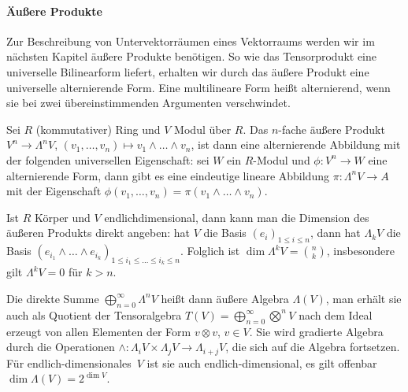 \paragraph{Äußere Produkte} Zur Beschreibung von Untervektorräumen eines Vektorraums werden wir im nächsten Kapitel äußere Produkte benötigen. So wie das Tensorprodukt eine universelle Bilinearform liefert, erhalten wir durch das äußere Produkt eine universelle alternierende Form. Eine multilineare Form heißt alternierend, wenn sie bei zwei übereinstimmenden Argumenten verschwindet.

\begin{defin}
Sei $R$ (kommutativer) Ring und $V$ Modul über $R$. Das $n$-fache äußere Produkt $V^n \to \Lambda^n V$, $(v_1, \dots, v_n) \mapsto v_1 \wedge \dots \wedge v_n$, ist dann eine alternierende Abbildung mit der folgenden universellen Eigenschaft: sei $W$ ein $R$-Modul und $\phi: V^n \to W$ eine alternierende Form, dann gibt es eine eindeutige lineare Abbildung $\pi: \Lambda^n V \to A$ mit der Eigenschaft $\phi(v_1, \dots, v_n) = \pi(v_1 \wedge \dots \wedge v_n)$.
\end{defin}

Ist $R$ Körper und $V$ endlichdimensional, dann kann man die Dimension des äußeren Produkts direkt angeben: hat $V$ die Basis $(e_i)_{1 \leq i \leq n}$, dann hat $\Lambda_k V$ die Basis $(e_{i_1} \wedge \dots \wedge e_{i_k})_{1 \leq i_1 \leq \dots \leq i_k \leq n}$. Folglich ist $\dim \Lambda^k V = \binom nk$, insbesondere gilt $\Lambda^k V = 0$ für $k > n$.

Die direkte Summe $\bigoplus_{n=0}^\infty \Lambda^n V$ heißt dann äußere Algebra $\Lambda(V)$, man erhält sie auch als Quotient der Tensoralgebra $T(V) = \bigoplus_{n=0}^\infty \bigotimes^n V$ nach dem Ideal erzeugt von allen Elementen der Form $v \otimes v$, $v \in V$. Sie wird gradierte Algebra durch die Operationen $\wedge: \Lambda_i V \times \Lambda_j V \to \Lambda_{i+j} V$, die sich auf die Algebra fortsetzen. Für endlich-dimensionales~$V$ ist sie auch endlich-dimensional, es gilt offenbar $\dim \Lambda(V) = 2^{\dim V}$.
